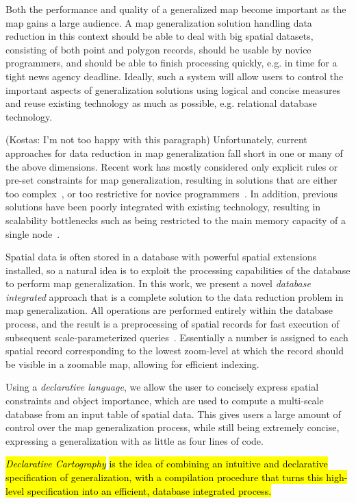 Both the performance and quality of a generalized map become important as the map gains a large audience. A map generalization solution handling data reduction in this context should be able to deal with big spatial datasets, consisting of both point and polygon records, should be usable by novice programmers, and should be able to finish processing quickly, e.g. in time for a tight news agency deadline. Ideally, such a system will allow users to control the important aspects of generalization solutions using logical and concise measures and reuse existing technology as much as possible, e.g. relational database technology.

(Kostas: I'm not too happy with this paragraph) Unfortunately, current approaches for data reduction in map generalization fall short in one or many of the above dimensions. Recent work has mostly considered only explicit rules or pre-set constraints for map generalization, resulting in solutions that are either too complex~\cite{sld,mapnik}, or too restrictive for novice programmers~\cite{sarma2012fusiontables,nutanong2012multiresolution}. In addition, previous solutions have been poorly integrated with existing technology, resulting in scalability bottlenecks such as being restricted to the main memory capacity of a single node~\cite{sarma2012fusiontables}. 
 

Spatial data is often stored in a database with powerful spatial extensions installed, so a natural idea is to exploit the processing capabilities of the database to perform map generalization. In this work, we present a novel \emph{database integrated} approach that is a complete solution to the data reduction problem in map generalization. All operations are performed entirely within the database process, and the result is a preprocessing of spatial records for fast execution of subsequent scale-parameterized queries~\cite{hilbert1891ueber}. Essentially a number is assigned to each spatial record corresponding to the lowest zoom-level at which the record should be visible in a zoomable map, allowing for efficient indexing.

Using a \emph{declarative language}, we allow the user to concisely express spatial constraints and object importance, which are used to compute a multi-scale database from an input table of spatial data. This gives users a large amount of control over the map generalization process, while still being extremely concise, expressing a generalization with as little as four lines of code.

\emph{\hl{Declarative Cartography}}\hl{ is the idea of combining an intuitive and declarative specification of generalization, with a compilation procedure that turns this high-level specification into an efficient, database integrated process.}

